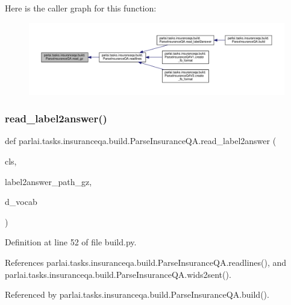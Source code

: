 Here is the caller graph for this function\+:
\nopagebreak
\begin{figure}[H]
\begin{center}
\leavevmode
\includegraphics[width=350pt]{classparlai_1_1tasks_1_1insuranceqa_1_1build_1_1ParseInsuranceQA_a3f2322d59e42f329387912bd3d03c888_icgraph}
\end{center}
\end{figure}
\mbox{\label{classparlai_1_1tasks_1_1insuranceqa_1_1build_1_1ParseInsuranceQA_a24c20a520141dbc602a242780281ee6d}} 
\subsubsection{\texorpdfstring{read\+\_\+label2answer()}{read\_label2answer()}}
{\footnotesize\ttfamily def parlai.\+tasks.\+insuranceqa.\+build.\+Parse\+Insurance\+Q\+A.\+read\+\_\+label2answer (\begin{DoxyParamCaption}\item[{}]{cls,  }\item[{}]{label2answer\+\_\+path\+\_\+gz,  }\item[{}]{d\+\_\+vocab }\end{DoxyParamCaption})}



Definition at line 52 of file build.\+py.



References parlai.\+tasks.\+insuranceqa.\+build.\+Parse\+Insurance\+Q\+A.\+readlines(), and parlai.\+tasks.\+insuranceqa.\+build.\+Parse\+Insurance\+Q\+A.\+wids2sent().



Referenced by parlai.\+tasks.\+insuranceqa.\+build.\+Parse\+Insurance\+Q\+A.\+build().

